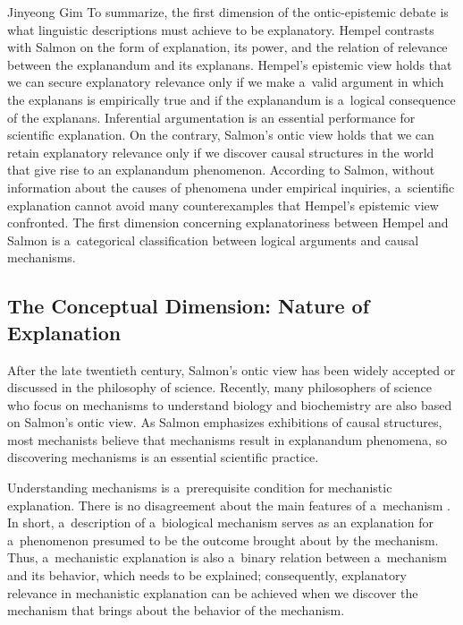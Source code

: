 \begin{artengenv}{Jinyeong Gim}
To summarize, the first dimension of the ontic-epistemic debate is what linguistic descriptions must achieve to be explanatory. Hempel contrasts with Salmon on the form of explanation, its power, and the relation of relevance between the explanandum and its explanans. Hempel's epistemic view holds that we can secure explanatory relevance only if we make a~valid argument in which the explanans is empirically true and if the explanandum is a~logical consequence of the explanans. Inferential argumentation is an essential performance for scientific explanation. On the contrary, Salmon's ontic view holds that we can retain explanatory relevance only if we discover causal structures in the world that give rise to an explanandum phenomenon. According to Salmon, without information about the causes of phenomena under empirical inquiries, a~scientific explanation cannot avoid many counterexamples that Hempel's epistemic view confronted. The first dimension concerning explanatoriness between Hempel and Salmon is a~categorical classification between logical arguments and causal mechanisms.

\subsection{The Conceptual Dimension: Nature of Explanation}

After the late twentieth century, Salmon's ontic view has been widely accepted or discussed in the philosophy of science. Recently, many philosophers of science who focus on mechanisms to understand biology and biochemistry are also based on Salmon's ontic view. As Salmon emphasizes exhibitions of causal structures, most mechanists believe that mechanisms result in explanandum phenomena, so discovering mechanisms is an essential scientific practice.

Understanding mechanisms is a~prerequisite condition for mechanistic explanation. There is no disagreement about the main features of a~mechanism
\parencite[][pp.15–26]{craver_search_2013}. %
 In short, a~description of a~biological mechanism serves as an explanation for a~phenomenon presumed to be the outcome brought about by the mechanism. Thus, a~mechanistic explanation is also a~binary relation between a~mechanism and its behavior, which needs to be explained; consequently, explanatory relevance in mechanistic explanation can be achieved when we discover the mechanism that brings about the behavior of the mechanism.


\end{artengenv}

